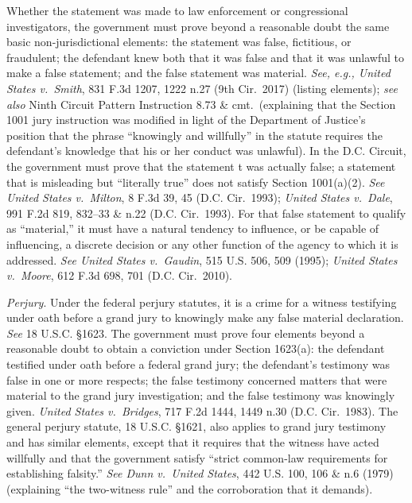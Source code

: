 Whether the statement was made to law enforcement or congressional investigators, the government must prove beyond a reasonable doubt the same basic non-jurisdictional elements: the statement was false, fictitious, or fraudulent; the defendant knew both that it was false and that it was unlawful to make a false statement; and the false statement was material.
\textit{See, e.g., United States v.\ Smith}, 831 F.3d 1207, 1222 n.27 (9th Cir.~2017) (listing elements); \textit{see also} Ninth Circuit Pattern Instruction 8.73 \& cmt.\ (explaining that the Section 1001 jury instruction was modified in light of the Department of Justice's position that the phrase ``knowingly and willfully'' in the statute requires the defendant's knowledge that his or her conduct was unlawful).
In the D.C. Circuit, the government must prove that the statement t was actually false; a statement that is misleading but ``literally true'' does not satisfy Section 1001(a)(2).
\textit{See United States v.\ Milton}, 8 F.3d 39, 45 (D.C. Cir.~1993); \textit{United States v.\ Dale}, 991 F.2d 819, 832--33 \& n.22 (D.C. Cir.~1993).
For that false statement to qualify as ``material,'' it must have a natural tendency to influence, or be capable of influencing, a discrete decision or any other function of the agency to which it is addressed.
\textit{See United States v.\ Gaudin}, 515 U.S. 506, 509 (1995); \textit{United States v.\ Moore}, 612 F.3d 698, 701 (D.C. Cir.~2010).

\textit{Perjury}.
Under the federal perjury statutes, it is a crime for a witness testifying under oath before a grand jury to knowingly make any false material declaration.
\textit{See} 18 U.S.C. \S 1623.
The government must prove four elements beyond a reasonable doubt to obtain a conviction under Section 1623(a): the defendant testified under oath before a federal grand jury; the defendant's testimony was false in one or more respects; the false testimony concerned matters that were material to the grand jury investigation; and the false testimony was knowingly given.
\textit{United States v.\ Bridges}, 717 F.2d 1444, 1449 n.30 (D.C. Cir.~1983).
The general perjury statute, 18 U.S.C. \S 1621, also applies to grand jury testimony and has similar elements, except that it requires that the witness have acted willfully and that the government satisfy ``strict common-law requirements for establishing falsity.''
\textit{See Dunn v.\ United States}, 442 U.S. 100, 106 \& n.6 (1979) (explaining ``the two-witness rule'' and the corroboration that it demands).


